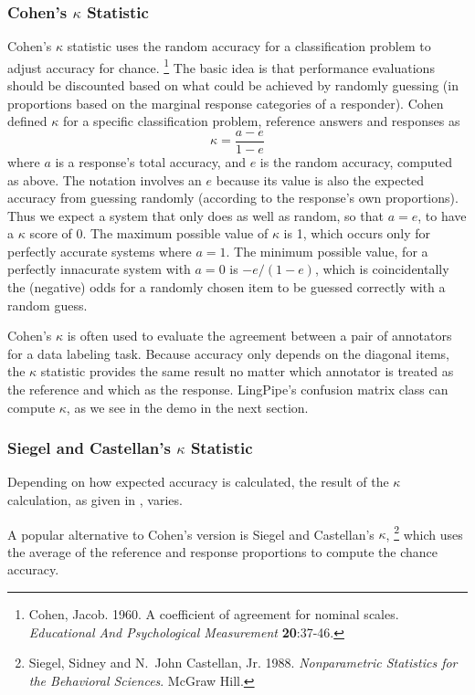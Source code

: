\subsubsection{Cohen's $\kappa$ Statistic}

Cohen's $\kappa$ statistic uses the random accuracy for a
classification problem to adjust accuracy for chance.%
%
\footnote{Cohen, Jacob. 1960. A coefficient of agreement for nominal
  scales. {\it Educational And Psychological Measurement} {\bf
    20}:37-46.}
%
The basic idea is that performance evaluations should be discounted
based on what could be achieved by randomly guessing (in proportions
based on the marginal response categories of a responder).  Cohen
defined $\kappa$ for a specific classification problem, reference
answers and responses as
%
\begin{equation}\label{eq:kappa-statistic}
\kappa = \frac{a - e}{1 - e}
\end{equation}
%
where $a$ is a response's total accuracy, and $e$ is the random
accuracy, computed as above.  The notation involves an $e$ because its
value is also the expected accuracy from guessing randomly (according
to the response's own proportions).  Thus we expect a system that only
does as well as random, so that $a = e$, to have a $\kappa$ score of
0.  The maximum possible value of $\kappa$ is 1, which occurs only for
perfectly accurate systems where $a = 1$.  The minimum possible value,
for a perfectly innacurate system with $a = 0$ is $-e/(1-e)$, which is
coincidentally the (negative) odds for a randomly chosen item to be
guessed correctly with a random guess.

Cohen's $\kappa$ is often used to evaluate the agreement between a
pair of annotators for a data labeling task.  Because accuracy only
depends on the diagonal items, the $\kappa$ statistic provides the
same result no matter which annotator is treated as the reference and
which as the response.  LingPipe's confusion matrix class can compute
$\kappa$, as we see in the demo in the next section.

\subsubsection{Siegel and Castellan's $\kappa$ Statistic}

Depending on how expected accuracy is calculated, the result of the
$\kappa$ calculation, as given in , varies.

A popular alternative to Cohen's version is Siegel and Castellan's
$\kappa$, 
%
\footnote{Siegel, Sidney and N.~John Castellan, Jr. 1988.  {\it
    Nonparametric Statistics for the Behavioral Sciences}. McGraw
  Hill.}
%
which uses the average of the reference and response
proportions to compute the chance accuracy.  

